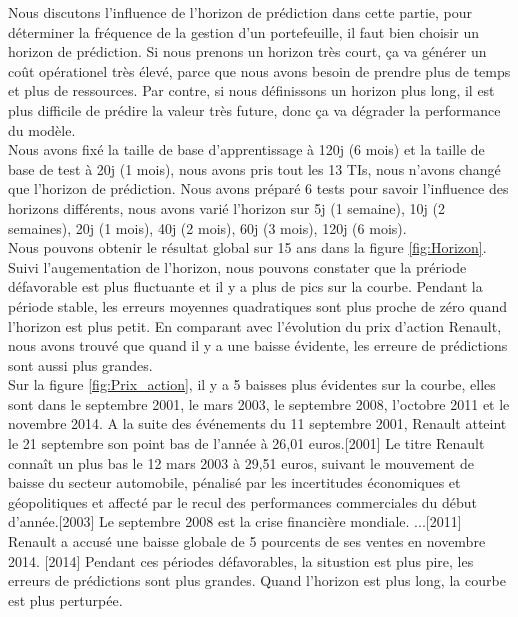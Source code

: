 Nous discutons l'influence de l'horizon de prédiction dans cette partie, pour déterminer la fréquence de la gestion d'un portefeuille, il faut bien choisir un horizon de prédiction. Si nous prenons un horizon très court, ça va générer un coût opérationel très élevé, parce que nous avons besoin de prendre plus de temps et plus de ressources. Par contre, si nous définissons un horizon plus long, il est plus difficile de prédire la valeur très future, donc ça va dégrader la performance du modèle. \\

Nous avons fixé la taille de base d'apprentissage à 120j (6 mois) et la taille de base de test à 20j (1 mois), nous avons pris tout les 13 TIs, nous n'avons changé que l'horizon de prédiction. Nous avons préparé 6 tests pour savoir l'influence des horizons différents, nous avons varié l'horizon sur 5j (1 semaine), 10j (2 semaines), 20j (1 mois), 40j (2 mois), 60j (3 mois), 120j (6 mois). \\

Nous pouvons obtenir le résultat global sur 15 ans dans la figure \ref{fig:Horizon}. Suivi l'augementation de l'horizon, nous pouvons constater que la prériode défavorable est plus fluctuante et il y a plus de pics sur la courbe. Pendant la période stable, les erreurs moyennes quadratiques sont plus proche de zéro quand l'horizon est plus petit. En comparant avec l'évolution du prix d'action Renault, nous avons trouvé que quand il y a une baisse évidente, les erreure de prédictions sont aussi plus grandes. \\

Sur la figure \ref{fig:Prix_action}, il y a 5 baisses plus évidentes sur la courbe, elles sont dans le septembre 2001, le mars 2003, le septembre 2008, l'octobre 2011 et le novembre 2014. A la suite des événements du 11 septembre 2001, Renault atteint le 21 septembre son point bas de l'année à 26,01 euros.[2001] Le titre Renault connaît un plus bas le 12 mars 2003 à 29,51 euros, suivant le mouvement de baisse du secteur automobile, pénalisé par les incertitudes économiques et géopolitiques et affecté par le recul des performances commerciales du début d’année.[2003] Le septembre 2008 est la crise financière mondiale. ...[2011] Renault a accusé une baisse globale de 5 pourcents de ses ventes en novembre 2014. [2014] Pendant ces périodes défavorables, la situstion est plus pire, les erreurs de prédictions sont plus grandes. Quand l'horizon est plus long, la courbe est plus perturpée. \\ 



